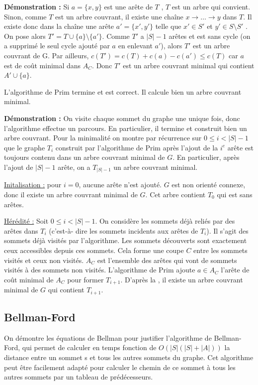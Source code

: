 \documentclass[../../../main.tex]{subfiles}
\begin{document}
\textbf{Démonstration :} Si $a = \{x, y\}$ est une arête de $T$ , $T$ est un arbre qui convient. Sinon, comme $T$ est
un arbre couvrant, il existe une chaîne $x\rightarrow \dots \rightarrow y$ dans $T$. Il existe donc dans la chaîne une arête
$a' = \{x' , y'\}$ telle que $x'\in S'$ et $y'\in S \setminus S'$ . On pose alors $T' = T\cup\{a\} \setminus \{a'\}$. Comme $T'$ a $|S| - 1$
arêtes et est sans cycle (on a supprimé le seul cycle ajouté par $a$ en enlevant $a'$), alors $T'$ est un arbre
couvrant de G. Par ailleurs, $c(T') = c(T) + c(a) - c(a') \leq c(T)$ car $a$ est de coût minimal dans $A_C$.\newline
Donc $T'$ est un arbre couvrant minimal qui contient $A'\cup \{a\}$.

 L’algorithme de Prim termine et est
correct. Il calcule bien un arbre couvrant minimal.

\textbf{Démonstration :} On visite chaque sommet du graphe une unique fois, donc l’algorithme effectue un
parcours. En particulier, il termine et construit bien un arbre couvrant. Pour la minimalité on montre
par récurrence sur $0 \leq i < |S| - 1$ que le graphe $T_i$ construit par l’algorithme de Prim après l’ajout de
la $i^e$ arête est toujours contenu dans un arbre couvrant minimal de $G$. En particulier, après l’ajout de
$|S| - 1$ arête, on a $T_{|S|-1}$ un arbre couvrant minimal.

\underline{Initalisation :} pour $i = 0$, aucune arête n’est ajouté. $G$ est non orienté connexe, donc il existe un arbre
couvrant minimal de $G$. Cet arbre contient $T_0$ qui est sans arêtes.

\underline{Hérédité :} Soit $0 \leq i < |S| - 1$. On considère les sommets déjà reliés par des arêtes dans $T_i$ (c’est-à-
dire les sommets incidents aux arêtes de $T_i$). Il s’agit des sommets déjà visités par l’algorithme. Les
sommets découverts sont exactement ceux accessibles depuis ces sommets. Cela forme une coupe $C$
entre les sommets visités et ceux non visités. $A_C$ est l’ensemble des arêtes qui vont de sommets visités
à des sommets non visités. L’algorithme de Prim ajoute $a\in A_C$ l’arête de coût minimal de $A_C$ pour
former $T_{i+1}$. D’après la , il existe un arbre couvrant minimal de $G$ qui contient $T_{i+1}$.
\subsection{Bellman-Ford}
On démontre les équations de Bellman pour justifier l'algorithme de Bellman-Ford, qui permet de
calculer en temps fonction de $O(|S|(|S| + |A|))$ la distance entre un sommet s et tous les autres
sommets du graphe. Cet algorithme peut être facilement adapté pour calculer le chemin de ce sommet
à tous les autres sommets par un tableau de prédécesseurs.
\end{document}
